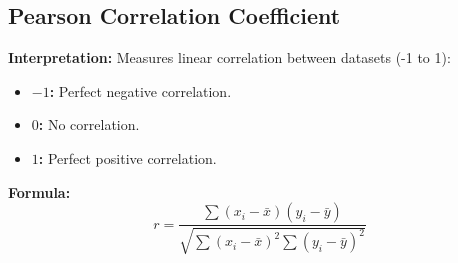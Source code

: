 \subsection{Pearson Correlation Coefficient}

\textbf{Interpretation:} Measures linear correlation between datasets (-1 to 1):

\begin{itemize}[label=-]
	\item \textbf{$-1$:} Perfect negative correlation.
	\item \textbf{$0$:} No correlation.
	\item \textbf{$1$:} Perfect positive correlation.
\end{itemize}

\textbf{Formula:}
\[ r = \dfrac{\sum (x_{i} - \bar{x})(y_{i} - \bar{y})}{\sqrt{\sum (x_{i} - \bar{x})^{2} \sum (y_{i} - \bar{y})^{2}}} \]